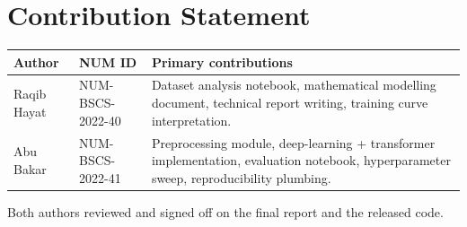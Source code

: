 \documentclass[
  english,
  11pt,
]{article}
\newcounter{none} %
\begin{document}
\newpage

\section{Contribution Statement}\label{contribution-statement}

{\def\LTcaptype{none} %
\begin{longtable}[]{@{}
  >{\raggedright\arraybackslash}p{}
  >{\raggedright\arraybackslash}p{}
  >{\raggedright\arraybackslash}p{}@{}}
\toprule\noalign{}
\begin{minipage}[b]{\linewidth}\raggedright
Author
\end{minipage} & \begin{minipage}[b]{\linewidth}\raggedright
NUM ID
\end{minipage} & \begin{minipage}[b]{\linewidth}\raggedright
Primary contributions
\end{minipage} \\
\midrule\noalign{}
\endhead
\bottomrule\noalign{}
\endlastfoot
Raqib Hayat & NUM-BSCS-2022-40 & Dataset analysis notebook, mathematical
modelling document, technical report writing, training curve
interpretation. \\
Abu Bakar & NUM-BSCS-2022-41 & Preprocessing module, deep-learning +
transformer implementation, evaluation notebook, hyperparameter sweep,
reproducibility plumbing. \\
\end{longtable}
}

Both authors reviewed and signed off on the final report and the
released code.
\end{document}
